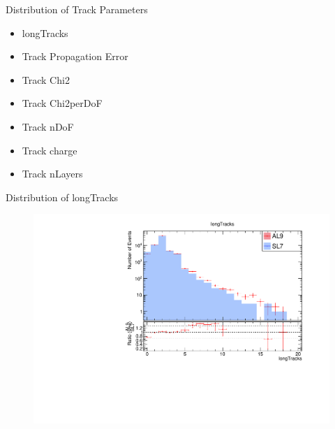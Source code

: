 \begin{frame}{Distribution of Track Parameters}
    \centering
    \begin{itemize}
        \item longTracks
        \item Track Propagation Error
        \item Track Chi2
        \item Track Chi2perDoF
        \item Track nDoF
        \item Track charge
        \item Track nLayers
    \end{itemize}
\end{frame}

\begin{frame}{Distribution of longTracks}
    \begin{figure}
        \includegraphics[width=\linewidth]{output/longTracks.pdf}
    \end{figure}
\end{frame}

